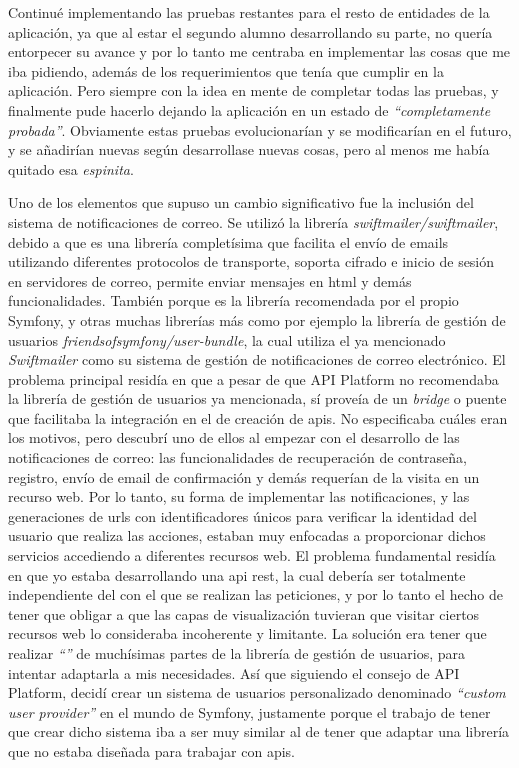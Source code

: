 Continué implementando las pruebas restantes para el resto de entidades de la aplicación,
ya que al estar el segundo alumno desarrollando su parte, no quería entorpecer su avance
y por lo tanto me centraba en implementar las cosas que me iba pidiendo, además de los
requerimientos que tenía que cumplir en la aplicación. Pero siempre con la idea en mente
de completar todas las pruebas, y finalmente pude hacerlo dejando la aplicación en un
estado de \textit{``completamente probada''}. Obviamente estas pruebas evolucionarían
y se modificarían en el futuro, y se añadirían nuevas según desarrollase nuevas cosas,
pero al menos me había quitado esa \textit{espinita}.

Uno de los elementos que supuso un cambio significativo fue la inclusión del
sistema de notificaciones de correo. Se utilizó la librería \textit{swiftmailer/swiftmailer},
debido a que es una librería completísima que facilita el envío de emails utilizando
diferentes protocolos de transporte, soporta cifrado e inicio de sesión en
servidores de correo, permite enviar mensajes en \gls{html}\cite{swiftmailer_symfony} y demás
funcionalidades. También porque es la librería recomendada por el propio 
Symfony, y otras muchas librerías más como por ejemplo la librería de gestión de usuarios
\textit{friendsofsymfony/user-bundle}, la cual utiliza el ya mencionado \textit{Swiftmailer} como
su sistema de gestión de notificaciones de correo electrónico. El problema principal residía en que
a pesar de que API Platform no recomendaba la librería de gestión de usuarios ya mencionada, sí
proveía de un \textit{bridge}\cite{apip_fosuser} o puente que facilitaba la integración en el 
de creación de \gls{api}s. No especificaba cuáles eran los motivos, pero descubrí
uno de ellos al empezar con el desarrollo de las notificaciones de correo: las
funcionalidades de recuperación de contraseña, registro, envío de email de confirmación
y demás requerían de la visita en un recurso web. Por lo tanto, su forma de implementar
las notificaciones, y las generaciones de \gls{url}s con identificadores únicos para
verificar la identidad del usuario que realiza las acciones, estaban muy enfocadas a
proporcionar dichos servicios accediendo a diferentes recursos web. El problema
fundamental residía en que yo estaba desarrollando una \gls{api} \gls{rest}, la
cual debería ser totalmente independiente del  con el
que se realizan las peticiones, y por lo tanto el hecho de tener que obligar a que
las capas de visualización tuvieran que visitar ciertos recursos web lo consideraba
incoherente y limitante. La solución era tener que realizar \textit{``''}
de muchísimas partes de la librería de gestión de usuarios, para intentar adaptarla a
mis necesidades. Así que siguiendo el consejo de API Platform, decidí crear un sistema
de usuarios personalizado \textemdash denominado \textit{``custom user provider''} en
el mundo de Symfony\textemdash, justamente porque el trabajo de tener que crear dicho
sistema iba a ser muy similar al de tener que adaptar una librería que no estaba diseñada
para trabajar con \gls{api}s.

